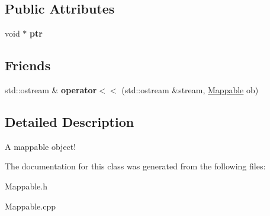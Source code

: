 \subsection*{\-Public \-Attributes}
\begin{DoxyCompactItemize}
\item 
\hypertarget{classMappable_a8d9f478e553703116d7f636f19461de4}{void $\ast$ {\bfseries ptr}}\label{classMappable_a8d9f478e553703116d7f636f19461de4}

\end{DoxyCompactItemize}
\subsection*{\-Friends}
\begin{DoxyCompactItemize}
\item 
\hypertarget{classMappable_a0b57649bb1e7774386e133f026d60176}{std\-::ostream \& {\bfseries operator$<$$<$} (std\-::ostream \&stream, \hyperlink{classMappable}{\-Mappable} ob)}\label{classMappable_a0b57649bb1e7774386e133f026d60176}

\end{DoxyCompactItemize}


\subsection{\-Detailed \-Description}
\-A mappable object! 

\-The documentation for this class was generated from the following files\-:\begin{DoxyCompactItemize}
\item 
\-Mappable.\-h\item 
\-Mappable.\-cpp\end{DoxyCompactItemize}
